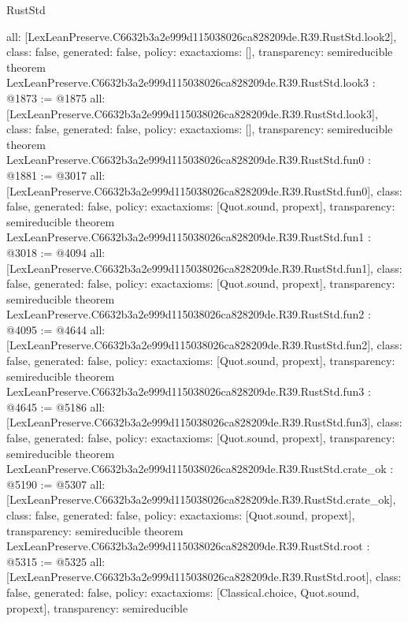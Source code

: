 \begin{lexlean}{RustStd}
\begin{coremodule}
{  all: [LexLeanPreserve.C6632b3a2e999d115038026ca828209de.R39.RustStd.look2],
  class: false,
  generated: false,
  policy: exact{axioms: []},
  transparency: semireducible
}
theorem LexLeanPreserve.C6632b3a2e999d115038026ca828209de.R39.RustStd.look3 : @1873 := @1875 {
  all: [LexLeanPreserve.C6632b3a2e999d115038026ca828209de.R39.RustStd.look3],
  class: false,
  generated: false,
  policy: exact{axioms: []},
  transparency: semireducible
}
theorem LexLeanPreserve.C6632b3a2e999d115038026ca828209de.R39.RustStd.fun0 : @1881 := @3017 {
  all: [LexLeanPreserve.C6632b3a2e999d115038026ca828209de.R39.RustStd.fun0],
  class: false,
  generated: false,
  policy: exact{axioms: [Quot.sound, propext]},
  transparency: semireducible
}
theorem LexLeanPreserve.C6632b3a2e999d115038026ca828209de.R39.RustStd.fun1 : @3018 := @4094 {
  all: [LexLeanPreserve.C6632b3a2e999d115038026ca828209de.R39.RustStd.fun1],
  class: false,
  generated: false,
  policy: exact{axioms: [Quot.sound, propext]},
  transparency: semireducible
}
theorem LexLeanPreserve.C6632b3a2e999d115038026ca828209de.R39.RustStd.fun2 : @4095 := @4644 {
  all: [LexLeanPreserve.C6632b3a2e999d115038026ca828209de.R39.RustStd.fun2],
  class: false,
  generated: false,
  policy: exact{axioms: [Quot.sound, propext]},
  transparency: semireducible
}
theorem LexLeanPreserve.C6632b3a2e999d115038026ca828209de.R39.RustStd.fun3 : @4645 := @5186 {
  all: [LexLeanPreserve.C6632b3a2e999d115038026ca828209de.R39.RustStd.fun3],
  class: false,
  generated: false,
  policy: exact{axioms: [Quot.sound, propext]},
  transparency: semireducible
}
theorem LexLeanPreserve.C6632b3a2e999d115038026ca828209de.R39.RustStd.crate_ok : @5190 := @5307 {
  all: [LexLeanPreserve.C6632b3a2e999d115038026ca828209de.R39.RustStd.crate_ok],
  class: false,
  generated: false,
  policy: exact{axioms: [Quot.sound, propext]},
  transparency: semireducible
}
theorem LexLeanPreserve.C6632b3a2e999d115038026ca828209de.R39.RustStd.root : @5315 := @5325 {
  all: [LexLeanPreserve.C6632b3a2e999d115038026ca828209de.R39.RustStd.root],
  class: false,
  generated: false,
  policy: exact{axioms: [Classical.choice, Quot.sound, propext]},
  transparency: semireducible
}


\end{coremodule}
\end{lexlean}

